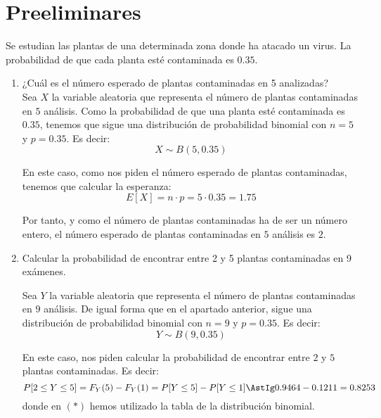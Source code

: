 \setcounter{section}{-1}
\section{Preeliminares}

\begin{ejercicio}
    Se estudian las plantas de una determinada zona donde ha atacado un virus. La probabilidad de
    que cada planta esté contaminada es $0.35$.
    \begin{enumerate}
        \item ¿Cuál es el número esperado de plantas contaminadas en 5 analizadas?\\
        Sea $X$ la variable aleatoria que representa el número de plantas contaminadas en $5$ análisis.
        Como la probabilidad de que una planta esté contaminada es $0.35$, tenemos que sigue una distribución de probabilidad binomial con $n=5$ y $p=0.35$. Es decir:
        \begin{equation*}
            X \sim B(5,0.35)
        \end{equation*}

        En este caso, como nos piden el número esperado de plantas contaminadas, tenemos que calcular la esperanza:
        \begin{equation*}
            E[X] = n \cdot p = 5 \cdot 0.35 = 1.75
        \end{equation*}

        Por tanto, y como el número de plantas contaminadas ha de ser un número entero, el número esperado de plantas contaminadas en $5$ análisis es $2$.

        \item Calcular la probabilidad de encontrar entre 2 y 5 plantas contaminadas en 9 exámenes.
        
        Sea $Y$ la variable aleatoria que representa el número de plantas contaminadas en $9$ análisis.
        De igual forma que en el apartado anterior, sigue una distribución de probabilidad binomial con $n=9$ y $p=0.35$. Es decir:
        \begin{equation*}
            Y \sim B(9,0.35)
        \end{equation*}

        En este caso, nos piden calcular la probabilidad de encontrar entre $2$ y $5$ plantas contaminadas. Es decir:
        \begin{equation*}
            P[2 \leq Y \leq 5] = F_Y(5) - F_Y(1) = P[Y\leq 5] - P[Y\leq 1] \AstIg 0.9464 - 0.1211 = 0.8253
        \end{equation*}
        donde en $(\ast)$ hemos utilizado la tabla de la distribución binomial.


\end{enumerate}
\end{ejercicio}
